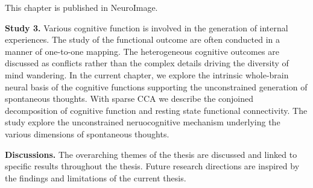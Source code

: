 This chapter is published in NeuroImage.

\textbf{Study 3.} Various cognitive function is involved in the generation of internal experiences. The study of the functional outcome are often conducted in a manner of one-to-one mapping. The heterogeneous cognitive outcomes are discussed as conflicts rather than the complex details driving the diversity of mind wandering. In the current chapter, we explore the intrinsic whole-brain neural basis of the cognitive functions supporting the unconstrained generation of spontaneous thoughts.  With sparse CCA we describe the conjoined decomposition of cognitive function and resting state functional connectivity. The study explore the unconstrained neruocognitive mechanism underlying the various dimensions of spontaneous thoughts.

\textbf{Discussions.} The overarching themes of the thesis are discussed and linked to specific results throughout the thesis. Future research directions are inspired by the findings and limitations of the current thesis.

